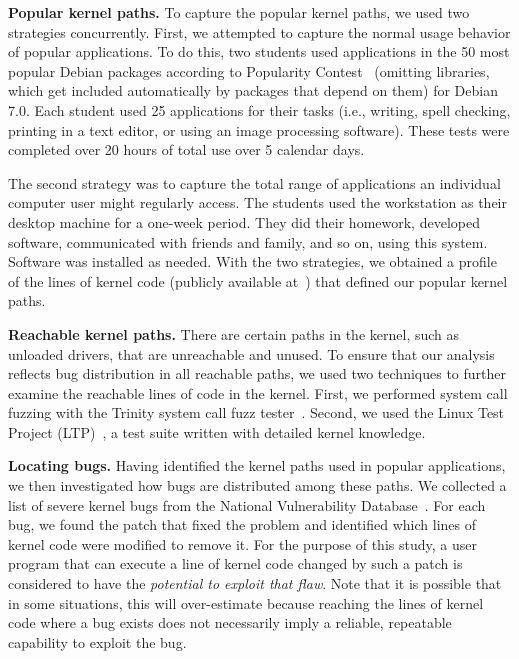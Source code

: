 \textbf{Popular kernel paths.}
To capture the popular kernel paths, we used two strategies concurrently.
First, we attempted to capture the normal usage behavior of popular applications.
To do this, two students used applications in the 50 most popular Debian
packages according to Popularity Contest~\cite{Top-Packages} (omitting 
libraries, which get included automatically by packages that depend on them) 
for Debian 7.0. %
Each student used 25 applications for their 
tasks (i.e., writing, spell checking, printing in a text editor, or using
an image processing software). 
These tests were completed over 20 hours of
total use over 5 calendar days.

The second strategy was to capture the total range of applications an
individual computer user might regularly access. The students used the workstation as their
desktop machine for a one-week period. They did their homework, developed
software, communicated with friends and family, and so on, using this 
system.  Software was installed as needed.
%
With the two strategies, we obtained a profile of the lines of
kernel code (publicly available at~\cite{Lind}) that defined our
popular kernel paths.

\textbf{Reachable kernel paths.}
There are certain paths in the kernel, such as unloaded drivers, that are
unreachable and unused.
To ensure that our analysis reflects bug distribution in all reachable paths,
we used two techniques to further examine the reachable lines of
code in the kernel. First,
we performed system call fuzzing with the Trinity
system call fuzz tester~\cite{Trinity}.
Second, we used the Linux Test Project (LTP)~\cite{LTP}, a test suite written
with detailed kernel knowledge.
%

\textbf{Locating bugs.}
Having identified the kernel paths used in popular applications,
we then investigated how bugs are distributed among these paths. We collected a list of
severe kernel bugs from the National Vulnerability Database~\cite{NVD}.
For each bug, we found the patch that fixed the problem and identified
which lines of kernel code were modified to remove it.
For the purpose of this study, a user program that can execute a line of kernel
code changed by such a patch is considered to have the \textit{potential to
exploit that flaw}.  Note that it is possible that in some situations, 
this will over-estimate because reaching the lines of kernel code where a 
bug exists does not necessarily imply a reliable, repeatable capability to
exploit the bug.

